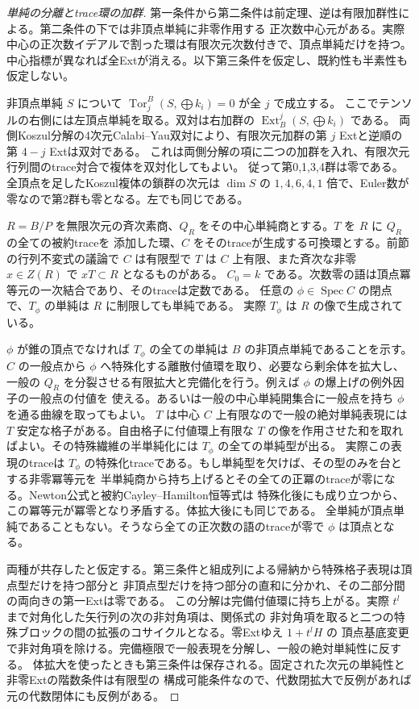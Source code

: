 \begin{proof}[単純の分離とtrace環の加群]
第一条件から第二条件は前定理、逆は有限加群性による。第二条件の下では非頂点単純に非零作用する
正次数中心元がある。実際中心の正次数イデアルで割った環は有限次元次数付きで、頂点単純だけを持つ。
中心指標が異なれば全Extが消える。以下第三条件を仮定し、既約性も半素性も仮定しない。

非頂点単純 $S$ について $\operatorname{Tor}^B_j(S,\bigoplus k_i)=0$ が全 $j$ で成立する。
ここでテンソルの右側には左頂点単純を取る。双対は右加群の $\operatorname{Ext}^j_B(S,\bigoplus k_i)$ である。
両側Koszul分解の4次元Calabi--Yau双対により、有限次元加群の第 $j$ Extと逆順の第 $4-j$ Extは双対である。
これは両側分解の項に二つの加群を入れ、有限次元行列間のtrace対合で複体を双対化してもよい。
従って第0,1,3,4群は零である。全頂点を足したKoszul複体の鎖群の次元は
$\dim S$ の $1,4,6,4,1$ 倍で、Euler数が零なので第2群も零となる。左でも同じである。

$R=B/P$ を無限次元の斉次素商、$Q_R$ をその中心単純商とする。$T$ を $R$ に $Q_R$ の全ての被約traceを
添加した環、$C$ をそのtraceが生成する可換環とする。前節の行列不変式の議論で $C$ は有限型で $T$ は
$C$ 上有限、また斉次な非零 $x\in Z(R)$ で $xT\subset R$ となるものがある。
$C_0=k$ である。次数零の語は頂点冪等元の一次結合であり、そのtraceは定数である。
任意の $\phi\in\operatorname{Spec} C$ の閉点で、$T_\phi$ の単純は $R$ に制限しても単純である。
実際 $T_\phi$ は $R$ の像で生成されている。

$\phi$ が錐の頂点でなければ $T_\phi$ の全ての単純は $B$ の非頂点単純であることを示す。
$C$ の一般点から $\phi$ へ特殊化する離散付値環を取り、必要なら剰余体を拡大し、一般の
$Q_R$ を分裂させる有限拡大と完備化を行う。例えば $\phi$ の爆上げの例外因子の一般点の付値を
使える。あるいは一般の中心単純開集合に一般点を持ち $\phi$ を通る曲線を取ってもよい。
$T$ は中心 $C$ 上有限なので一般の絶対単純表現には $T$ 安定な格子がある。自由格子に付値環上有限な
$T$ の像を作用させた和を取ればよい。その特殊繊維の半単純化には $T_\phi$ の全ての単純型が出る。
実際この表現のtraceは $T_\phi$ の特殊化traceである。もし単純型を欠けば、その型のみを台とする非零冪等元を
半単純商から持ち上げるとその全ての正冪のtraceが零になる。Newton公式と被約Cayley--Hamilton恒等式は
特殊化後にも成り立つから、この冪等元が冪零となり矛盾する。体拡大後にも同じである。
全単純が頂点単純であることもない。そうなら全ての正次数の語のtraceが零で $\phi$ は頂点となる。

両種が共存したと仮定する。第三条件と組成列による帰納から特殊格子表現は頂点型だけを持つ部分と
非頂点型だけを持つ部分の直和に分かれ、その二部分間の両向きの第一Extは零である。
この分解は完備付値環に持ち上がる。実際 $t^l$ まで対角化した矢行列の次の非対角項は、関係式の
非対角項を取ると二つの特殊ブロックの間の拡張のコサイクルとなる。零Extゆえ $1+t^l H$ の
頂点基底変更で非対角項を除ける。完備極限で一般表現を分解し、一般の絶対単純性に反する。
体拡大を使ったときも第三条件は保存される。固定された次元の単純性と非零Extの階数条件は有限型の
構成可能条件なので、代数閉拡大で反例があれば元の代数閉体にも反例がある。


\end{proof}
